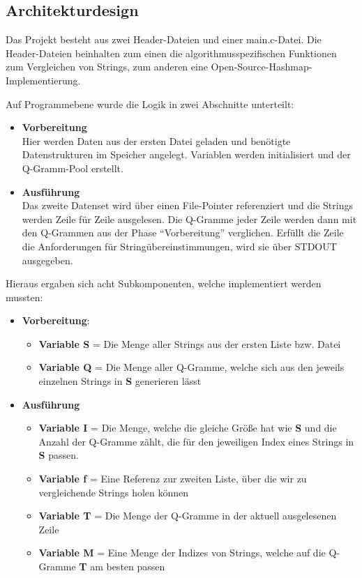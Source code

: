 \clearpage
\subsection{Architekturdesign}

Das Projekt besteht aus zwei Header-Dateien und einer main.c-Datei. Die Header-Dateien
beinhalten zum einen die algorithmusspezifischen Funktionen zum Vergleichen von
Strings, zum anderen eine Open-Source-Hashmap-Implementierung.

Auf Programmebene wurde die Logik in zwei Abschnitte unterteilt:
\begin{itemize}
    \item \textbf{Vorbereitung} \\
    Hier werden Daten aus der ersten Datei geladen und benötigte Datenstrukturen im Speicher angelegt.
    Variablen werden initialisiert und der Q-Gramm-Pool erstellt.
    \item \textbf{Ausführung} \\
    Das zweite Datenset wird über einen File-Pointer referenziert und die
    Strings werden Zeile für Zeile ausgelesen. Die Q-Gramme jeder Zeile werden dann mit den Q-Grammen aus der Phase "`Vorbereitung"' verglichen. Erfüllt die Zeile die Anforderungen für Stringübereinstimmungen, wird sie über STDOUT ausgegeben.
\end{itemize}

Hieraus ergaben sich acht Subkomponenten, welche implementiert werden mussten:


\begin{itemize}
    \item \textbf{Vorbereitung}:
    \begin{itemize}
        \item \textbf{Variable S} = Die Menge aller Strings aus der ersten Liste bzw. Datei
        \item \textbf{Variable Q} = Die Menge aller Q-Gramme, welche sich aus den jeweils einzelnen Strings in \textbf{S} generieren lässt
    \end{itemize}

    \item \textbf{Ausführung}
    \begin{itemize}
        \item \textbf{Variable I} = Die Menge, welche die gleiche Größe hat wie \textbf{S} und die
        Anzahl der Q-Gramme zählt, die für den jeweiligen Index eines Strings in
       \textbf{S} passen.
        \item \textbf{Variable f} = Eine Referenz zur zweiten Liste, über die wir zu vergleichende Strings holen können
        \item \textbf{Variable T} = Die Menge der Q-Gramme in der aktuell ausgelesenen Zeile
        \item \textbf{Variable M} = Eine Menge der Indizes von Strings, welche auf die Q-Gramme \textbf{T} am besten passen
    \end{itemize}
\end{itemize}


